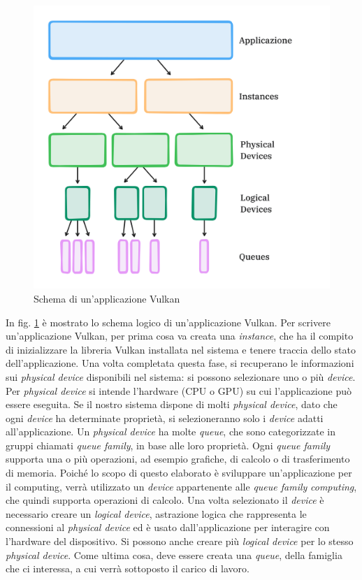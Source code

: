 \begin{figure}[ht]
    \centering
    \includegraphics[width=.7\linewidth]{images/chapter2/vulkan_scheme.png}
    \caption{Schema di un'applicazione Vulkan}
    \label{fig:vulkan_scheme}
\end{figure}

In fig. \ref{fig:vulkan_scheme} è mostrato lo schema logico di un'applicazione Vulkan.
Per scrivere un'applicazione Vulkan, per prima cosa va creata una \textit{instance}, che ha il compito di inizializzare la libreria Vulkan installata nel sistema e tenere traccia dello stato dell'applicazione. Una volta completata questa fase, si recuperano le informazioni sui \textit{physical device} disponibili nel sistema: si possono selezionare uno o più \textit{device}. Per \textit{physical device} si intende l'hardware (\gls{CPU} o \gls{GPU}) su cui l'applicazione può essere eseguita. Se il nostro sistema dispone di molti \textit{physical device}, dato che ogni \textit{device} ha determinate proprietà, si selezioneranno solo i \textit{device} adatti all'applicazione. Un \textit{physical device} ha molte \textit{queue}, che sono categorizzate in gruppi chiamati \textit{queue family}, in base alle loro proprietà. Ogni \textit{queue family} supporta una o più operazioni, ad esempio grafiche, di calcolo o di trasferimento di memoria. Poiché lo scopo di questo elaborato è sviluppare un'applicazione per il computing, verrà utilizzato un \textit{device} appartenente alle \textit{queue family} \textit{computing}, che quindi supporta operazioni di calcolo. Una volta selezionato il \textit{device} è necessario creare un \textit{logical device}, astrazione logica che rappresenta le connessioni al \textit{physical device} ed è usato dall'applicazione per interagire con l'hardware del dispositivo. Si possono anche creare più \textit{logical device} per lo stesso \textit{physical device}. Come ultima cosa, deve essere creata una \textit{queue}, della famiglia che ci interessa, a cui verrà sottoposto il carico di lavoro.


